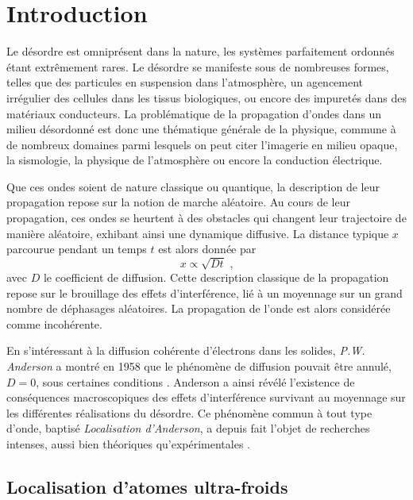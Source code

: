 
\chapter{Introduction}

Le désordre est omniprésent dans la nature, les systèmes parfaitement ordonnés étant extrêmement rares. Le désordre se manifeste sous de nombreuses formes, telles que des particules en suspension dans l'atmosphère, un agencement irrégulier des cellules dans les tissus biologiques, ou encore des impuretés dans des matériaux conducteurs. La problématique de la propagation d'ondes dans un milieu désordonné est donc une thématique générale de la physique, commune à de nombreux domaines parmi lesquels on peut citer l'imagerie en milieu opaque, la sismologie, la physique de l'atmosphère ou encore la conduction électrique. 

Que ces ondes soient de nature classique ou quantique, la description de leur propagation repose sur la notion de marche aléatoire. Au cours de leur propagation, ces ondes se heurtent à des obstacles qui changent leur trajectoire de manière aléatoire, exhibant ainsi une dynamique diffusive. La distance typique $x$ parcourue pendant un temps $t$ est alors donnée par
\begin{equation}
x\propto\sqrt{Dt} \text{ ,}
\end{equation}
avec $D$ le coefficient de diffusion. Cette description classique de la propagation repose sur le brouillage des effets d'interférence, lié à un moyennage sur un grand nombre de déphasages aléatoires. La propagation de l'onde est alors considérée comme incohérente.

En s'intéressant à la diffusion cohérente d'électrons dans les solides, \emph{P.W. Anderson} a montré en 1958 que le phénomène de diffusion pouvait être annulé, $D=0$, sous certaines conditions \citep{anderson1958absence}. Anderson a ainsi révélé l'existence de conséquences macroscopiques des effets d'interférence survivant au moyennage sur les différentes réalisations du désordre. Ce phénomène commun à tout type d'onde, baptisé \emph{Localisation d'Anderson}, a depuis fait l'objet de recherches intenses, aussi bien théoriques qu'expérimentales \citep{lagendijk2009fifty}. 


\section{Localisation d'atomes ultra-froids}

